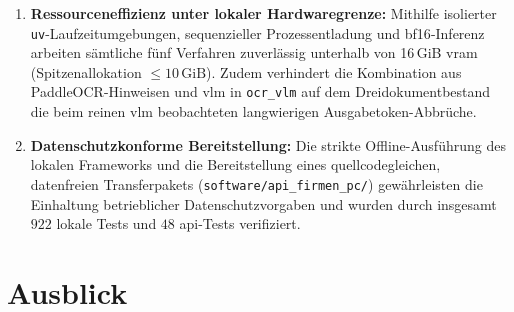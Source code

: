 \begin{enumerate}
  \item \textbf{Ressourceneffizienz unter lokaler Hardwaregrenze:} Mithilfe isolierter \texttt{uv}-Laufzeitumgebungen, sequenzieller Prozessentladung und \ac{bf16}-Inferenz arbeiten sämtliche fünf Verfahren zuverlässig unterhalb von \mbox{16\,GiB} \ac{vram} (Spitzenallokation $\le 10\,\text{GiB}$). Zudem verhindert die Kombination aus PaddleOCR-Hinweisen und \ac{vlm} in \texttt{ocr\_vlm} auf dem Dreidokumentbestand die beim reinen \ac{vlm} beobachteten langwierigen Ausgabetoken-Abbrüche.
  \item \textbf{Datenschutzkonforme Bereitstellung:} Die strikte Offline-Ausführung des lokalen Frameworks und die Bereitstellung eines quellcodegleichen, datenfreien Transferpakets (\texttt{software/api\_firmen\_pc/}) gewährleisten die Einhaltung betrieblicher Datenschutzvorgaben und wurden durch insgesamt $922$ lokale Tests und $48$ \ac{api}-Tests verifiziert.
\end{enumerate}

\section{Ausblick}
\label{sec:fazit-ausblick}

